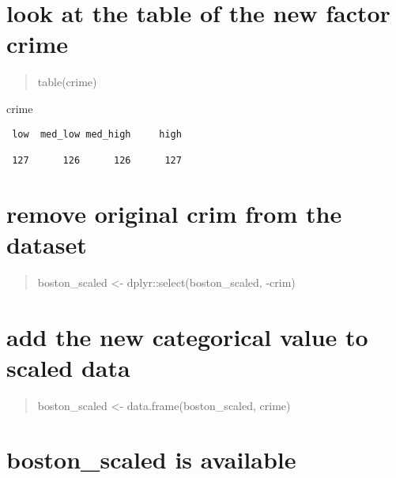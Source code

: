 \documentclass[]{article}
\begin{document}
\begin{quote}
\end{quote}

\section{look at the table of the new factor
crime}\label{look-at-the-table-of-the-new-factor-crime-1}

\begin{quote}
table(crime)
\end{quote}

crime

\begin{verbatim}
 low  med_low med_high     high  

 127      126      126      127 
\end{verbatim}

\begin{quote}
\end{quote}

\section{remove original crim from the
dataset}\label{remove-original-crim-from-the-dataset-1}

\begin{quote}
boston\_scaled \textless{}- dplyr::select(boston\_scaled, -crim)
\end{quote}

\begin{quote}
\end{quote}

\section{add the new categorical value to scaled
data}\label{add-the-new-categorical-value-to-scaled-data-1}

\begin{quote}
boston\_scaled \textless{}- data.frame(boston\_scaled, crime)
\end{quote}

\section{boston\_scaled is available}\label{boston_scaled-is-available}

\begin{quote}
\end{quote}
\end{document}
